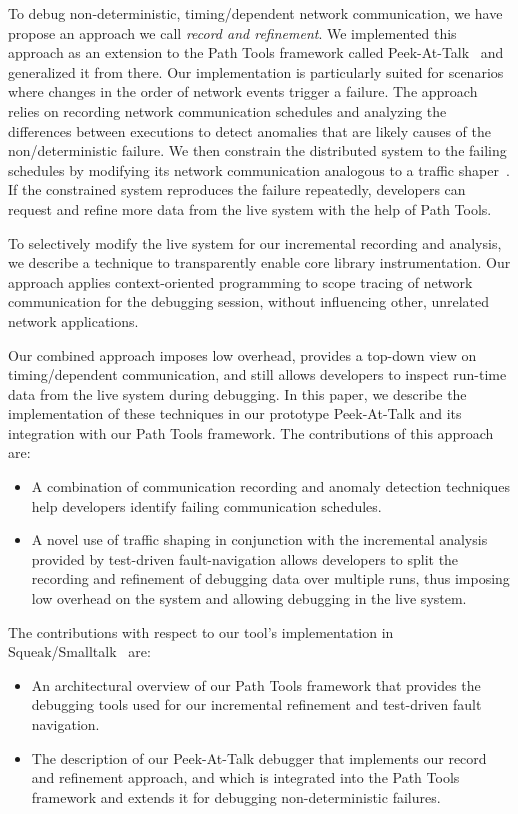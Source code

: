\documentclass[preprint,3p]{elsarticle}
\newcommand{\toolname}{Peek-At-Talk\xspace}
\begin{document}
To debug non-deterministic, timing\-/dependent network communication, we have
propose an approach we call \emph{record and refinement}. We implemented this
approach as an extension to the Path Tools framework called
\toolname~\cite{felgentreff2013wasdett} and generalized it from there.  Our
implementation is particularly suited for scenarios where changes in the order
of network events trigger a failure. The approach relies on recording network
communication schedules and analyzing the differences between executions to
detect anomalies that are likely causes of the non\-/deterministic failure. We
then constrain the distributed system to the failing schedules by modifying its
network communication analogous to a traffic shaper~\cite{IetfShaper}. If the
constrained system reproduces the failure repeatedly, developers can request and
refine more data from the live system with the help of Path Tools.

To selectively modify the live system for our incremental recording and
analysis, we describe a technique to transparently enable core library
instrumentation. Our approach applies context-oriented programming to scope
tracing of network communication for the debugging session, without influencing
other, unrelated network applications.

Our combined approach imposes low overhead, provides a top-down view on
timing\-/dependent communication, and still allows developers to inspect
run-time data from the live system during debugging. In this paper, we describe
the implementation of these techniques in our prototype \toolname and its
integration with our Path Tools framework. The contributions of this approach are:
\begin{itemize}
\item A combination of communication recording and anomaly detection techniques
  help developers identify failing communication schedules.
\item A novel use of traffic shaping in conjunction with the incremental
  analysis provided by test-driven fault-navigation allows developers to split
  the recording and refinement of debugging data over multiple runs, thus
  imposing low overhead on the system and allowing debugging in the live system.
\end{itemize}

The contributions with respect to our tool's implementation in
Squeak/Smalltalk~\cite{Ingalls1997} are:
\begin{itemize}
\item An architectural overview of our Path Tools framework that provides the
  debugging tools used for our incremental refinement and test-driven fault
  navigation.
\item The description of our \toolname debugger that implements our record and
  refinement approach, and which is integrated into the Path Tools framework and
  extends it for debugging non-deterministic failures.
\end{itemize}
\end{document}
